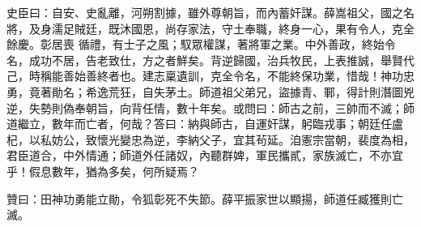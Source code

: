 \begin{pinyinscope}
 史臣曰：自安、史亂離，河朔割據，雖外尊朝旨，而內蓄奸謀。薛嵩祖父，國之名將，及身濡足賊廷，既沐國恩，尚存家法，守土奉職，終身一心，果有令人，克全餘慶。彰居喪
 循禮，有士子之風；馭眾權謀，著將軍之業。中外善政，終始令名，成功不居，告老致仕，方之者鮮矣。背逆歸國，治兵牧民，上表推誠，舉賢代己，時稱能善始善終者也。建志稟遺訓，克全令名，不能終保功業，惜哉！神功忠勇，竟著勛名；希逸荒狂，自失茅土。師道祖父弟兄，盜據青、鄆，得計則潛圖兇逆，失勢則偽奉朝旨，向背任情，數十年矣。或問曰：師古之前，三帥而不滅；師道繼立，數年而亡者，何哉？答曰：納與師古，自運奸謀，躬臨戎事；朝廷任盧
 杞，以私妨公，致懷光變忠為逆，李納父子，宜其茍延。洎憲宗當朝，裴度為相，君臣道合，中外情通；師道外任諸奴，內聽群婢，軍民攜貳，家族滅亡，不亦宜乎！假息數年，猶為多矣，何所疑焉？



 贊曰：田神功勇能立勛，令狐彰死不失節。薛平振家世以顯揚，師道任臧獲則亡
 滅。



\end{pinyinscope}
